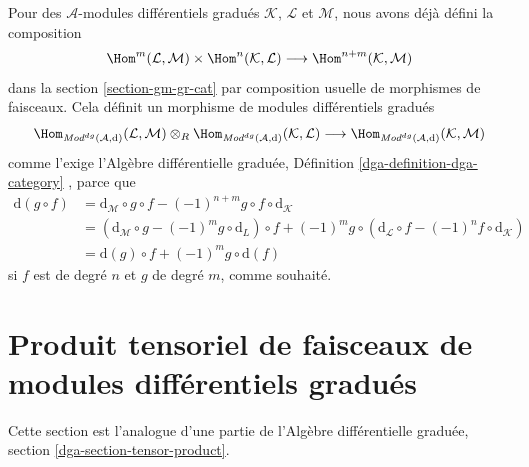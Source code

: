 \medskip\noindent
Pour des $\mathcal{A}$-modules différentiels gradués $\mathcal{K}$, $\mathcal{L}$ et $\mathcal{M}$, nous avons déjà défini la composition
$$
\Hom^m(\mathcal{L}, \mathcal{M}) \times
\Hom^n(\mathcal{K}, \mathcal{L}) \longrightarrow
\Hom^{n + m}(\mathcal{K}, \mathcal{M})
$$
dans la section \ref{section-gm-gr-cat} par composition usuelle de morphismes de faisceaux.
Cela définit un morphisme de modules différentiels gradués
$$
\Hom_{\textit{Mod}^{dg}(\mathcal{A}, \text{d})}(\mathcal{L}, \mathcal{M})
\otimes_R
\Hom_{\textit{Mod}^{dg}(\mathcal{A}, \text{d})}(\mathcal{K}, \mathcal{L})
\longrightarrow
\Hom_{\textit{Mod}^{dg}(\mathcal{A}, \text{d})}(\mathcal{K}, \mathcal{M})
$$
comme l'exige l'Algèbre différentielle graduée, Définition \ref{dga-definition-dga-category} , parce que
\begin{align*}
\text{d}(g \circ f) & =
\text{d}_\mathcal{M} \circ g \circ f
- (-1)^{n + m} g \circ f \circ \text{d}_\mathcal{K} \\
& =
\left(\text{d}_\mathcal{M} \circ g - (-1)^m g \circ \text{d}_L\right) \circ f
+ (-1)^m g \circ \left(\text{d}_\mathcal{L} \circ f
- (-1)^n f \circ \text{d}_\mathcal{K}\right) \\
& =
\text{d}(g) \circ f + (-1)^m g \circ \text{d}(f)
\end{align*}
si $f$ est de degré $n$ et $g$ de degré $m$, comme souhaité.






\section{Produit tensoriel de faisceaux de modules différentiels gradués}
\label{section-tensor-product-dg}

\noindent
Cette section est l'analogue d'une partie de l'Algèbre différentielle graduée, section \ref{dga-section-tensor-product}.

